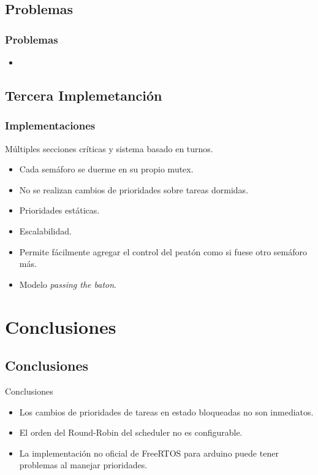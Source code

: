 \subsection{Problemas}
\begin{frame}
\frametitle{Problemas}
\begin{block}{}
	\begin{itemize}
		\item
	\end{itemize}
\end{block}
\end{frame}

\subsection{Tercera Implemetanción}
\begin{frame}
\frametitle{Implementaciones}
\begin{block}{Múltiples secciones críticas y sistema basado en turnos.}
	\begin{itemize}
		\item Cada semáforo se duerme en su propio mutex.
		\item No se realizan cambios de prioridades sobre tareas dormidas.
		\item Prioridades estáticas.
		\item Escalabilidad.
		\item Permite fácilmente agregar el control del peatón como si fuese otro semáforo más.
		\item Modelo \emph{passing the baton}.
	\end{itemize}
\end{block}
\end{frame}

\section{Conclusiones}

\subsection{Conclusiones}
\begin{frame}
	\begin{block}{Conclusiones}
		\begin{itemize}
			\item Los cambios de prioridades de tareas en estado bloqueadas no son inmediatos.
			\item El orden del Round-Robin del scheduler no es configurable.
			\item La implementación no oficial de FreeRTOS para arduino puede tener problemas al manejar prioridades.
		\end{itemize}
	\end{block}
\end{frame}